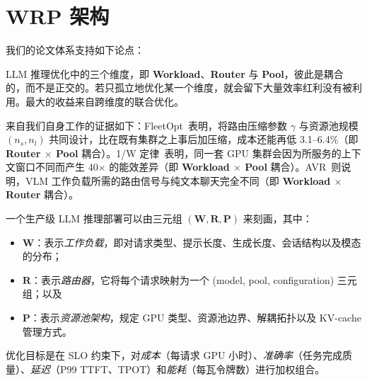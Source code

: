 \section{WRP 架构}
\label{sec:wrp}

我们的论文体系支持如下论点：

\begin{thesis}
\label{thesis:wrp}
LLM 推理优化中的三个维度，即 \textbf{Workload}、\textbf{Router} 与 \textbf{Pool}，彼此是耦合的，而不是正交的。若只孤立地优化某一个维度，就会留下大量效率红利没有被利用。最大的收益来自跨维度的联合优化。
\end{thesis}

来自我们自身工作的证据如下：FleetOpt~\cite{fleetopt2026}表明，将路由压缩参数 $\gamma$ 与资源池规模 $(n_s, n_l)$ 共同设计，比在既有集群之上事后加压缩，成本还能再低 3.1--6.4\%（即 \textbf{Router $\times$ Pool} 耦合）。1/W 定律~\cite{onewlaw2026}表明，同一套 GPU 集群会因为所服务的上下文窗口不同而产生 40$\times$ 的能效差异（即 \textbf{Workload $\times$ Pool} 耦合）。AVR~\cite{avr2026}则说明，VLM 工作负载所需的路由信号与纯文本聊天完全不同（即 \textbf{Workload $\times$ Router} 耦合）。

\begin{definition}[WRP 分解]
一个生产级 LLM 推理部署可以由三元组 $(\mathbf{W}, \mathbf{R}, \mathbf{P})$ 来刻画，其中：
\begin{itemize}[nosep]
  \item $\mathbf{W}$：表示\emph{工作负载}，即对请求类型、提示长度、生成长度、会话结构以及模态的分布；
  \item $\mathbf{R}$：表示\emph{路由器}，它将每个请求映射为一个 (model, pool, configuration) 三元组；以及
  \item $\mathbf{P}$：表示\emph{资源池架构}，规定 GPU 类型、资源池边界、解耦拓扑以及 KV-cache 管理方式。
\end{itemize}
优化目标是在 SLO 约束下，对\emph{成本}（每请求 GPU 小时）、\emph{准确率}（任务完成质量）、\emph{延迟}（P99 TTFT、TPOT）和\emph{能耗}（每瓦令牌数）进行加权组合。
\end{definition}
